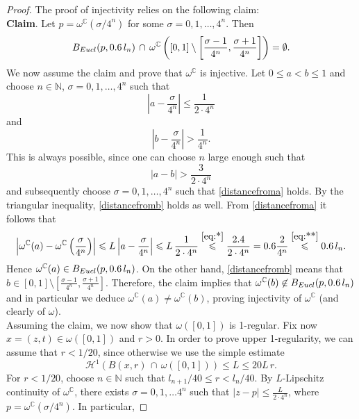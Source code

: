 \documentclass[10pt,a4paper]{amsart}
\newcommand{\C}{\mathbb C}
\newcommand{\N}{\mathbb N}
\renewcommand{\leq}{\leqslant}
\begin{document}
\begin{proof}
The proof of injectivity relies on the following claim:\medskip\\
  \textbf{Claim}. Let $p=\omega^\C(\sigma/4^n)$ for some $\sigma=0,1,\dots, 4^n$. Then
  \begin{equation}\label{eq:claim} B_{\rm Eucl}(p,0.6\, l_n)\,\cap\,\omega^\C\left([0,1]\setminus\left[\frac{\sigma-1}{4^n},\frac{\sigma +1}{4^n}\right]\right)=\emptyset. 
  \end{equation}
We now assume the claim and prove that $\omega^\C$ is injective. Let $0\leq a<b\leq 1$ and choose $n\in\N$, $\sigma=0,1,\dots, 4^n$ such that 
\begin{equation}\label{distancefroma}
    \left|a-\frac{\sigma}{4^n}\right|\leq \frac{1}{2\cdot4^n}
\end{equation}
and 
\begin{equation}\label{distancefromb}
   \left|b-\frac{\sigma}{4^n}\right|> \frac{1}{4^n}. 
\end{equation}
This is always possible, since one can choose $n$ large enough such that
\[|a-b|> \frac{3}{2\cdot4^n}\] and subsequently choose $\sigma=0,1,\dots,4^n$ such that \eqref{distancefroma} holds. By the triangular inequality, \eqref{distancefromb} holds as well.
From \eqref{distancefroma} it follows that 
\begin{equation}\label{eq:ainball}\left|\omega^\C(a)-\omega^\C\left(\frac{\sigma}{4^n}\right)\right|\leq L\left|a-\frac{\sigma}{4^n}\right|\leq L\,\frac{1}{2\cdot 4^n}\overset{\eqref{eq:*}}{\leq} \frac{2.4}{2\cdot 4^n}=0.6\frac{2}{4^n}\overset{\eqref{eq:**}}{\leq} 0.6 \,l_n.\end{equation} Hence $\omega^\C(a)\in B_{\rm Eucl}(p,0.6\, l_n)$. On the other hand,  \eqref{distancefromb} means that $b\in[0,1]\setminus [\frac{\sigma-1}{4^n},\frac{\sigma +1}{4^n}]$. Therefore, the claim implies that $\omega^\C(b)\not\in B_{\rm Eucl}(p,0.6\, l_n)$ and in particular we deduce $\omega^\C(a)\neq \omega^\C(b)$, proving injectivity of $\omega^\C$ (and clearly of $\omega$).\medskip\\
 Assuming the claim, we now show that $\omega([0,1])$ is 1-regular. Fix now $x=(z,t)\in \omega([0,1])$ and $r>0$. In order to prove upper 1-regularity, we can assume that $r<1/20$, since otherwise we use the simple estimate
  \[\mathcal H^1\left(B(x,r)\,\cap\,\omega\left([0,1]\right)\right)\leq  L\leq 20 L\,r.\]
For $r<1/20$,  choose $n\in\N$ such that $l_{n+1}/40\leq r<l_n/40$.
  By $L$-Lipschitz continuity of $\omega^\C$, there exists $\sigma=0,1,\dots 4^n$ such that $|z-p|\leq \frac{L}{2\cdot 4^n}$, where $p=\omega^\C(\sigma/4^n)$. In particular, %

\end{proof}
\end{document}
